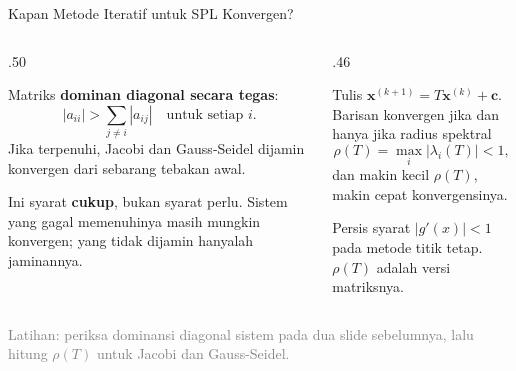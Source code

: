 \documentclass[aspectratio=169,10pt]{beamer}
\newcommand{\smallgray}[1]{\textcolor{GrayText}{\scriptsize #1}}
\begin{document}
\begin{frame}{Kapan Metode Iteratif untuk SPL Konvergen?}
\scriptsize
\begin{columns}[T,totalwidth=\textwidth]
\begin{column}{.50\textwidth}
\begin{bluebox}
Matriks \textbf{dominan diagonal secara tegas}:
\[
|a_{ii}|>\sum_{j\neq i}|a_{ij}|\quad\text{untuk setiap }i.
\]
Jika terpenuhi, Jacobi dan Gauss-Seidel dijamin konvergen dari sebarang tebakan awal.
\end{bluebox}
\begin{orangebox}
Ini syarat \textbf{cukup}, bukan syarat perlu. Sistem yang gagal memenuhinya masih mungkin konvergen; yang tidak dijamin hanyalah jaminannya.
\end{orangebox}
\end{column}
\begin{column}{.46\textwidth}
\begin{greenbox}
Tulis $\mathbf{x}^{(k+1)}=T\mathbf{x}^{(k)}+\mathbf{c}$. Barisan konvergen jika dan hanya jika radius spektral
\[
\rho(T)=\max_i|\lambda_i(T)|<1,
\]
dan makin kecil $\rho(T)$, makin cepat konvergensinya.
\end{greenbox}
\begin{goldbox}
Persis syarat $|g'(x)|<1$ pada metode titik tetap. $\rho(T)$ adalah versi matriksnya.
\end{goldbox}
\end{column}
\end{columns}
\vfill
\smallgray{Latihan: periksa dominansi diagonal sistem pada dua slide sebelumnya, lalu hitung $\rho(T)$ untuk Jacobi dan Gauss-Seidel.}
\end{frame}
\end{document}
